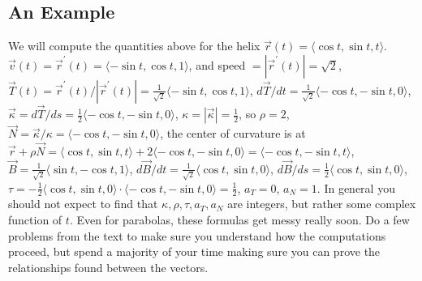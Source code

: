 \subsection{An Example}
We will compute the quantities above for the helix $\vec r(t) = \langle\cos
t,\sin t, t\rangle$.
$\vec v(t) = \vec r^\prime(t) = \langle-\sin t,\cos t, 1\rangle$, and speed $= |\vec
r^\prime(t)| = \sqrt{2}$,
$\vec T(t) = \vec r^\prime(t)/|\vec r^\prime(t)| = \frac{1}{\sqrt{2}}\langle-\sin
t,\cos t, 1\rangle$,
$d\vec T/dt = \frac{1}{\sqrt{2}}\langle-\cos t, -\sin t, 0\rangle$,
$\vec \kappa = d\vec T/ds = \frac{1}{2}\langle-\cos t, -\sin t, 0\rangle$,
$\kappa = |\vec \kappa|= \frac{1}{2}$, so $\rho = 2$,
$\vec N = \vec \kappa /\kappa = \langle-\cos t, -\sin t, 0\rangle$,
the center of curvature is at $\vec r+\rho\vec N = \langle\cos t,\sin t,
t\rangle+2\langle-\cos t, -\sin t, 0\rangle = \langle-\cos t,-\sin t, t\rangle$,
$\vec B = \frac{1}{\sqrt{2}}\langle\sin t,-\cos t, 1\rangle$,
$d\vec B/dt = \frac{1}{\sqrt{2}}\langle\cos t,\sin t, 0\rangle$,
$d\vec B/ds = \frac{1}{2}\langle\cos t,\sin t, 0\rangle$,
$\tau = - \frac{1}{2}\langle\cos t,\sin t, 0\rangle\cdot \langle-\cos t, -\sin t, 0\rangle =
\frac{1}{2}$,
$a_T=0$, $a_N=1$. In general you should not expect to find that $\kappa, \rho,
\tau,a_T, a_N$ are integers, but rather some complex function of $t$. 
Even for parabolas, these formulas get messy really soon.  Do a few
problems from the text to make sure you understand how the
computations proceed, but spend a majority of your time making sure
you can prove the relationships found between the vectors.












